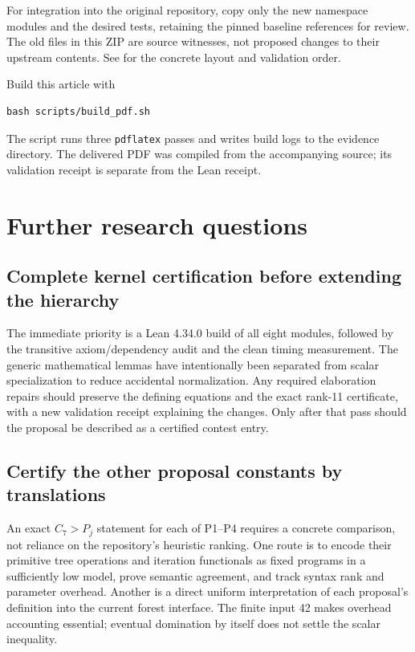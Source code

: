 \documentclass[11pt,letterpaper]{article}
\theoremstyle{definition}
\newcommand{\code}[1]{\texttt{#1}}
\newcommand{\src}[1]{\texttt{\detokenize{#1}}}
\begin{document}
For integration into the original repository, copy only the new namespace
modules and the desired tests, retaining the pinned baseline references for
review. The old files in this ZIP are source witnesses, not proposed changes
to their upstream contents. See \src{docs/INTEGRATION.md} for the concrete
layout and validation order.

Build this article with
\begin{lstlisting}
bash scripts/build_pdf.sh
\end{lstlisting}
The script runs three \code{pdflatex} passes and writes build logs to the
evidence directory. The delivered PDF was compiled from the accompanying
source; its validation receipt is separate from the Lean receipt.

\section{Further research questions}
\label{sec:future}

\subsection{Complete kernel certification before extending the hierarchy}

The immediate priority is a Lean 4.34.0 build of all eight modules, followed
by the transitive axiom/dependency audit and the clean timing measurement.
The generic mathematical lemmas have intentionally been separated from
scalar specialization to reduce accidental normalization. Any required
elaboration repairs should preserve the defining equations and the exact
rank-11 certificate, with a new validation receipt explaining the changes.
Only after that pass should the proposal be described as a certified
contest entry.

\subsection{Certify the other proposal constants by translations}

An exact $C_7>P_j$ statement for each of P1--P4 requires a concrete comparison,
not reliance on the repository's heuristic ranking. One route is to encode
their primitive tree operations and iteration functionals as fixed programs
in a sufficiently low model, prove semantic agreement, and track syntax
rank and parameter overhead. Another is a direct uniform interpretation of
each proposal's definition into the current forest interface. The finite
input 42 makes overhead accounting essential; eventual domination by itself
does not settle the scalar inequality.
\end{document}
